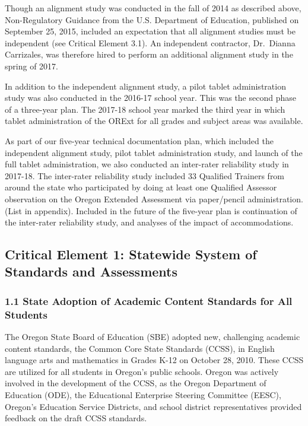 \documentclass[]{article}
\begin{document}
Though an alignment study was conducted in the fall of 2014 as described
above, Non-Regulatory Guidance from the U.S. Department of Education,
published on September 25, 2015, included an expectation that all
alignment studies must be independent (see Critical Element 3.1). An
independent contractor, Dr.~Dianna Carrizales, was therefore hired to
perform an additional alignment study in the spring of 2017.

In addition to the independent alignment study, a pilot tablet
administration study was also conducted in the 2016-17 school year. This
was the second phase of a three-year plan. The 2017-18 school year
marked the third year in which tablet administration of the ORExt for
all grades and subject areas was available.

As part of our five-year technical documentation plan, which included
the independent alignment study, pilot tablet administration study, and
launch of the full tablet administration, we also conducted an
inter-rater reliability study in 2017-18. The inter-rater reliability
study included 33 Qualified Trainers from around the state who
participated by doing at least one Qualified Assessor observation on the
Oregon Extended Assessment via paper/pencil administration. (List in
appendix). Included in the future of the five-year plan is continuation
of the inter-rater reliability study, and analyses of the impact of
accommodations.

\subsection{Critical Element 1: Statewide System of Standards and
Assessments}\label{critical-element-1-statewide-system-of-standards-and-assessments}

\subsubsection{1.1 State Adoption of Academic Content Standards for All
Students}\label{state-adoption-of-academic-content-standards-for-all-students}

The Oregon State Board of Education (SBE) adopted new, challenging
academic content standards, the Common Core State Standards (CCSS), in
English language arts and mathematics in Grades K-12 on October 28,
2010. These CCSS are utilized for all students in Oregon's public
schools. Oregon was actively involved in the development of the CCSS, as
the Oregon Department of Education (ODE), the Educational Enterprise
Steering Committee (EESC), Oregon's Education Service Districts, and
school district representatives provided feedback on the draft CCSS
standards.
\end{document}
